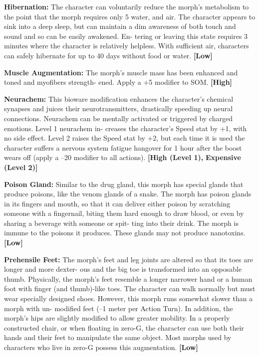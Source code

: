 \textbf{Hibernation:} The character can voluntarily reduce 
the morph's metabolism to the point that the morph 
requires only 5%
water, and air. The character appears to sink into a 
deep sleep, but can maintain a dim awareness of both 
touch and sound and so can be easily awakened. En-
tering or leaving this state requires 3 minutes where 
the character is relatively helpless. With sufficient 
air, characters can safely hibernate for up to 40 days 
without food or water. \textbf{[Low]}

\textbf{Muscle Augmentation:} The morph's muscle mass 
has been enhanced and toned and myofibers strength-
ened. Apply a +5 modifier to SOM. \textbf{[High]}

\textbf{Neurachem:} This bioware modification enhances 
the character's chemical synapses and juices their 
neurotransmitters, drastically speeding up neural 
connections. Neurachem can be mentally activated or 
triggered by charged emotions. Level 1 neurachem in-
creases the character's Speed stat by +1, with no side 
effect. Level 2 raises the Speed stat by +2, but each 
time it is used the character suffers a nervous system 
fatigue hangover for 1 hour after the boost wears off 
(apply a –20 modifier to all actions). \textbf{[High (Level 1), }
\textbf{Expensive (Level 2)]}

\textbf{Poison Gland:} Similar to the drug gland, this 
morph has special glands that produce poisons, 
like the venom glands of a snake. The morph has 
poison glands in its fingers and mouth, so that it can 
deliver either poison by scratching someone with a 
fingernail, biting them hard enough to draw blood, 
or even by sharing a beverage with someone or spit-
ting into their drink. The morph is immune to the 
poisons it produces. These glands may not produce 
nanotoxins. \textbf{[Low]}

\textbf{Prehensile Feet: }The morph's feet and leg joints are 
altered so that its toes are longer and more dexter-
ous and the big toe is transformed into an opposable 
thumb. Physically, the morph's feet resemble a longer 
narrower hand or a human foot with finger  (and 
thumb)-like toes. The character can walk normally 
but must wear specially designed shoes. However, this 
morph runs somewhat slower than a morph with un-
modified feet (–1 meter per Action Turn). In addition, 
the morph's hips are slightly modified to allow greater 
mobility. In a properly constructed chair, or when 
floating in zero-G, the character can use both their 
hands and their feet to manipulate the same object. 
Most morphs used by characters who live in zero-G 
possess this augmentation. \textbf{[Low]}

